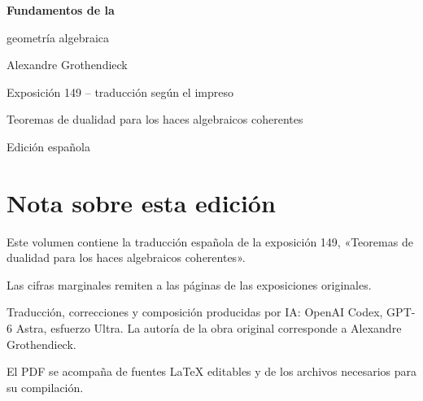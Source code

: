 \documentclass[11pt,twoside,openany]{book}
\newcommand{\FgaUnitKey}{frontmatter}
\theoremstyle{plain}
\theoremstyle{definition}
\theoremstyle{remark}
\begin{document}
\frontmatter
\begin{titlepage}
\centering
\vspace*{0.13\textheight}
{\Huge\bfseries Fundamentos de la\par geometría algebraica\par}
\vspace{1.5\baselineskip}
{\Large Alexandre Grothendieck\par}
\vfill
{\Large Exposición 149 -- traducción según el impreso\par}
\vspace{\baselineskip}
{\large Teoremas de dualidad para los haces algebraicos coherentes\par}
\vspace{1.5\baselineskip}
{\normalsize Edición española\par}
\end{titlepage}
\chapter*{Nota sobre esta edición}
Este volumen contiene la traducción española de la exposición 149, «Teoremas de dualidad para los haces algebraicos coherentes».

Las cifras marginales remiten a las páginas de las exposiciones originales.

Traducción, correcciones y composición producidas por IA: OpenAI Codex, GPT-6 Astra, esfuerzo Ultra.
La autoría de la obra original corresponde a Alexandre Grothendieck.

El PDF se acompaña de fuentes LaTeX editables y de los archivos necesarios para su compilación.

\tableofcontents
\mainmatter
\def\FgaUnitKey{149_diplomatic}
\end{document}
